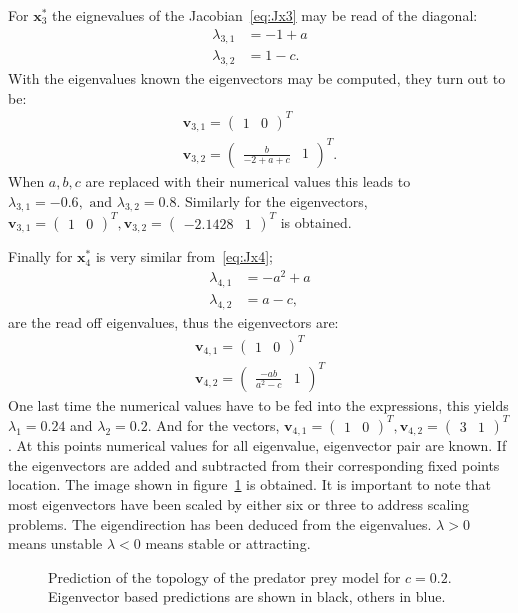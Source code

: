 For $\mathbf{x}_3^*$ the eignevalues of the Jacobian~\ref{eq:Jx3} may be read of the diagonal:
\begin{align}
\lambda_{3,1} &= -1+a \\
\lambda_{3,2} &= 1-c. 
\end{align}
With the eigenvalues known the eigenvectors may be  computed, they turn out to be:
\begin{align}
 \mathbf{v}_{3,1} = \begin{pmatrix} 1 & 0 \end{pmatrix}^T \\
\mathbf{v}_{3,2} = \begin{pmatrix}  \frac{b}{-2+a+c} & 1 \end{pmatrix}^T.
\end{align}
When $a,b,c$ are replaced with their numerical values this leads to $\lambda_{3,1} = -0.6, \text{ and } \lambda_{3,2} = 0.8 $. Similarly for the eigenvectors, $\mathbf{v}_{3,1} = \begin{pmatrix} 1 & 0 \end{pmatrix}^T,
\mathbf{v}_{3,2} = \begin{pmatrix} -2.1428& 1 \end{pmatrix}^T$ is obtained. 

Finally for $\mathbf{x}_4^*$ is very similar from~\ref{eq:Jx4};
\begin{align}
\lambda_{4,1} &= -a^2 + a \\
\lambda_{4,2} &= a-c,
\end{align}
are the read off eigenvalues, thus the eigenvectors are:
\begin{align}
 \mathbf{v}_{4,1} = \begin{pmatrix} 1 & 0 \end{pmatrix}^T \\
 \mathbf{v}_{4,2} = \begin{pmatrix} \frac{-ab}{a^2-c} & 1 \end{pmatrix}^T
\end{align}
One last time the numerical values have to be fed into the expressions, this yields $\lambda_1 = 0.24$ and $\lambda_2 = 0.2$. And for the vectors, $ \mathbf{v}_{4,1} = \begin{pmatrix} 1 & 0 \end{pmatrix}^T,
 \mathbf{v}_{4,2} = \begin{pmatrix} 3 & 1 \end{pmatrix}^T$. At this points numerical values for all eigenvalue, eigenvector pair are known. If the eigenvectors are added and subtracted from their corresponding fixed points location. The image shown in figure~\ref{fig:Top} is obtained. It is important to note that most eigenvectors have been scaled by either six or three to address scaling problems. The eigendirection has been deduced from the eigenvalues. $\lambda > 0$ means unstable $\lambda < 0$ means stable or attracting.

\begin{figure}
\centering

\caption{Prediction of the topology of the predator prey model for $c = 0.2$. Eigenvector based predictions are shown in black, others in blue.}
\label{fig:Top}
\end{figure}



